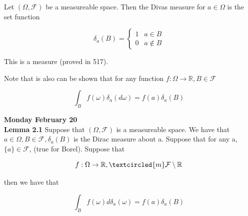 \documentclass[11pt,fleqn]{book} %
\begin{document}
\begin{definition}
	Let $(\Omega, \mathcal{F})$ be a measureable space. Then the Divas measure for $a \in \Omega$ is the set function 

			$$\delta_a(B) = \left\{\begin{array}{ll}
				1 & a \in B\\
				0 & a \notin B
			\end{array} \right. $$

	This is a measure (proved in 517). 
\end{definition}


Note that is also can be shown that for any function $f: \Omega \rightarrow \mathbb{R}, B \in \mathcal{F}$

		$$\int_B f(\omega) \delta_a (d \omega) = f(a) \delta_a(B) $$


\textbf{Monday February 20}\\

\textbf{Lemma 2.1} Suppose that $(\Omega, \mathcal{F})$ is a measureable space. We have that $a \in \Omega, B \in \mathcal{F}, \delta_a(B)$ is the Dirac measure about a. Suppose that for any a, $\{a\}\in \mathcal{F}$, (true for Borel). Suppose that

		$$f:\Omega \rightarrow \mathbb{R}, \textcircled{m} \mathcal{F}\setminus\mathbb{R} $$

then we have that

		$$\int_B f(\omega) d\delta_a(\omega) = f(a) \delta_a(B)$$
\end{document}
